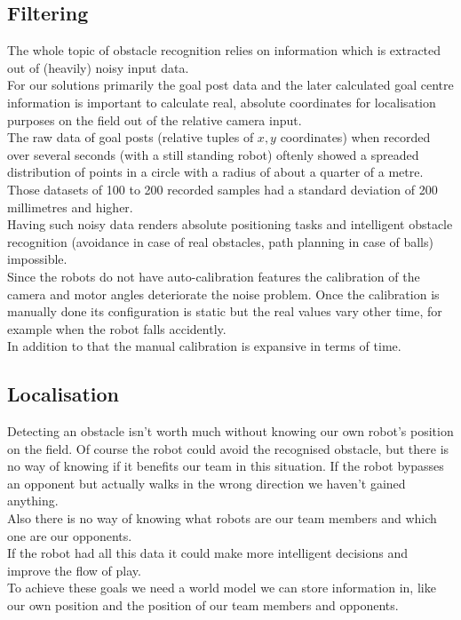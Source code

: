 \documentclass[lnicst,a4paper]{svmultln}
\begin{document}
\subsection{Filtering}
\label{sec:problems_filtering}
The whole topic of obstacle recognition relies on information which is extracted out of (heavily) noisy input data.
\\
For our solutions primarily the goal post data and the later calculated goal centre information is important to calculate real, absolute coordinates for localisation purposes on the field out of the relative camera input.
\\
The raw data of goal posts (relative tuples of $x, y$ coordinates) when recorded over several seconds (with a still standing robot) oftenly showed a spreaded distribution of points in a circle with a radius of about a quarter of a metre. Those datasets of 100 to 200 recorded samples had a standard deviation of 200 millimetres and higher.
\\
Having such noisy data renders absolute positioning tasks and intelligent obstacle recognition (avoidance in case of real obstacles, path planning in case of balls) impossible.
\\
Since the robots do not have auto-calibration features the calibration of the camera and motor angles deteriorate the noise problem. Once the calibration is manually done its configuration is static but the real values vary other time, for example when the robot falls accidently.
\\
In addition to that the manual calibration is expansive in terms of time.


\subsection{Localisation}
\label{sec:problems_localisation}
Detecting an obstacle isn't worth much without knowing our own robot's position on the field. Of course the robot could avoid the recognised obstacle, but there is no way of knowing if it benefits our team in this situation. If the robot bypasses an opponent but actually walks in the wrong direction we haven't gained anything. 
\\
Also there is no way of knowing what robots are our team members and which one are our opponents.
\\
If the robot had all this data it could make more intelligent decisions and improve the flow of play.
\\
To achieve these goals we need a world model we can store information in, like our own position and the position of our team members and opponents.
\end{document}
